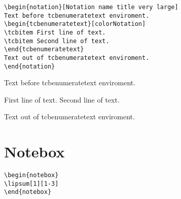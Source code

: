 \lipsum[1][1-3]

\begin{verbatim}
\begin{notation}[Notation name title very large]
Text before tcbenumeratetext enviroment.
\begin{tcbenumeratetext}[colorNotation]
\tcbitem First line of text.
\tcbitem Second line of text.
\end{tcbenumeratetext}
Text out of tcbenumeratetext enviroment.
\end{notation}
\end{verbatim}
\begin{notation}
Text before tcbenumeratetext enviroment.
\begin{tcbenumeratetext}[colorNotation]
\tcbitem First line of text.
\tcbitem Second line of text.
\end{tcbenumeratetext}
Text out of tcbenumeratetext enviroment.
\end{notation}


\section{Notebox}

\begin{verbatim}
\begin{notebox}
\lipsum[1][1-3]
\end{notebox}
\end{verbatim}
\begin{notebox}
\lipsum[1][1-3]
\end{notebox}


